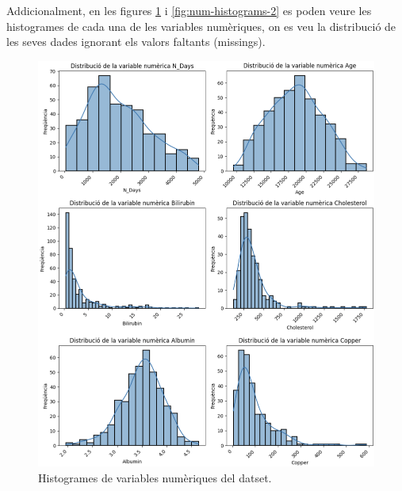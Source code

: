 Addicionalment, en les figures \ref{fig:num-histograms-1} i \ref{fig:num-histograms-2} es poden veure les histogrames de cada una de les variables numèriques, on es veu la distribució de les seves dades ignorant els valors faltants (missings).

\begin{figure}[H]
    \centering
    \includegraphics[width=\linewidth]{img/num-histograms-1.png}
    \caption{Histogrames de variables numèriques del datset.}
    \label{fig:num-histograms-1}
\end{figure}

